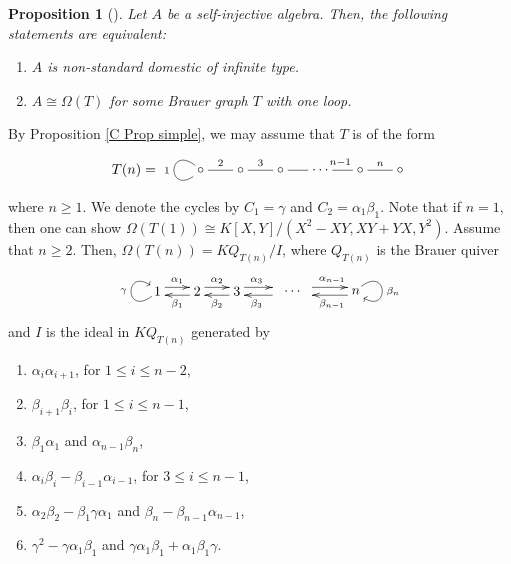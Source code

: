 \documentclass[12pt]{amsart}
\newtheorem{prop}[thm]{Proposition}
\numberwithin{equation}{thm}
\newcounter{ni}
\begin{document}
{\begin{prop}[{\cite[Theorem 4.14]{S}}]
\label{D Prop dom}
Let $A$ be a self-injective algebra. Then, the following statements are equivalent:
\begin{enumerate}
\item[(1)] $A$ is non-standard domestic of infinite type.
\item[(2)] $A\cong \Omega(T)$ for some Brauer graph $T$ with one loop.
\end{enumerate}
\end{prop}
By Proposition \ref{C Prop simple}, we may assume that $T$ is of the form
\[ T(n)=\begin{xy}
(0,0)*[o]+{\circ}="0", (10,0)*[o]+{\circ}="1",(20,0)*[o]+{\circ}="2", (30,0)*[o]+{\cdots}="d1",(40,0)*[o]+{\circ}="v1", (50,0)*[o]+{\circ}="d2", 
\ar @{-}"0";"1"^{2}
\ar @{-}"1";"2"^{3}
\ar @{-}"2";"d1"
\ar @{-}"d1";"v1"^{n-1}
\ar @{-}"v1";"d2"^{n}
\ar @{-} @(ul,dl)"0";"0"_{1}
\end{xy} \]
where $n\geq 1$. We denote the cycles by $C_1=\gamma$ and $C_2=\alpha_1\beta_1$. 
Note that if $n=1$, then one can show $\Omega(T(1))\cong K[X,Y]/(X^2-XY, XY+YX, Y^2)$. 
Assume that $n\geq 2$. Then, $\Omega(T(n)) = KQ_{T(n)}/I$, where $Q_{T(n)}$ is the Brauer quiver
\[
\begin{xy}
(0,0)*[o]+{1}="0",(10,0)*[o]+{2}="1",(20,0)*[o]+{3}="2", (30,0)*[o]+{}="3",(34,0)*{\cdots}="d1",(38,0)*[o]+{}="m-1",
(50,0)*[o]+{n}="m"
\ar @<1mm> "0";"1"^{\alpha_{1}}
\ar @<1mm> "1";"0"^{\beta_{1}}
\ar @<1mm> "1";"2"^{\alpha_{2}}
\ar @<1mm> "2";"1"^{\beta_{2}}
\ar @<1mm> "2";"3"^{\alpha_{3}}
\ar @<1mm> "3";"2"^{\beta_{3}}
\ar @<1mm> "m-1";"m"^{\alpha_{n-1}}
\ar @<1mm> "m";"m-1"^{\beta_{n-1}}
\SelectTips{eu}{}
\ar @(ur,dr) "m";"m"^{\beta_n}
\ar @(dl,ul)"0";"0"^{\gamma}
\end{xy}\]
and $I$ is the ideal in $KQ_{T(n)}$ generated by 
\begin{enumerate}
\item $\alpha_i\alpha_{i+1}$, for $1\leq i\leq n-2$,
\item $\beta_{i+1}\beta_{i}$, for $1\leq i \leq n-1$,
\item $\beta_1\alpha_1$ and $\alpha_{n-1}\beta_n$,
\item $\alpha_{i}\beta_{i}-\beta_{i-1}\alpha_{i-1}$, for $3\leq i\leq n-1$,
\item $\alpha_{2}\beta_{2}-\beta_1\gamma\alpha_1$ and $\beta_n-\beta_{n-1}\alpha_{n-1}$,
\item $\gamma^2-\gamma\alpha_1\beta_1$ and $\gamma\alpha_1\beta_1+\alpha_1\beta_1\gamma$.
\end{enumerate}

}
\end{document}
